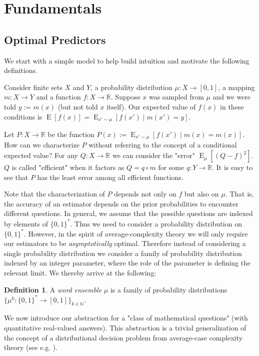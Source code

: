 \documentclass{article}
\theoremstyle{definition}
\newtheorem{definition}{Definition}[section]
\theoremstyle{plain}
\newcommand{\Words}{{\{ 0, 1 \}^*}}
\DeclareMathOperator{\E}{E}
\newcommand{\Nats}{\mathbb{N}}
\newcommand{\Reals}{\mathbb{R}}
\begin{document}
\section{Fundamentals}
%
\subsection{Optimal Predictors}

We start with a simple model to help build intuition and motivate the following definitions.

Consider finite sets $X$ and $Y$, a probability distribution $\mu: X \rightarrow [0,1]$, a mapping $m: X \rightarrow Y$ and a function $f: X \rightarrow \Reals$. Suppose $x$ was sampled from $\mu$ and we were told $y := m(x)$ (but not told $x$ itself). Our expected value of $f(x)$ in these conditions is $\E[f(x)] = \E_{x' \sim \mu}[f(x') \mid m(x') = y]$.

Let $P: X \rightarrow \Reals$ be the function $P(x) := \E_{x' \sim \mu}[f(x') \mid m(x) = m(x)]$. How can we characterize $P$ without referring to the concept of a conditional expected value? For any $Q: X \rightarrow \Reals$ we can consider the "error" $\E_\mu[(Q - f)^2]$. $Q$ is called "efficient" when it factors as $Q = q \circ m$ for some $q: Y \rightarrow \Reals$. It is easy to see that $P$ has the least error among all efficient functions.

Note that the characterization of $P$ depends not only on $f$ but also on $\mu$. That is, the accuracy of an estimator depends on the prior probabilities to encounter different questions. In general, we assume that the possible questions are indexed by elements of $\Words$. Thus we need to consider a probability distribution on $\Words$. However, in the spirit of average-complexity theory we will only require our estimators to be \emph{asymptotically} optimal. Therefore instead of considering a single probability distribution we consider a family of probability distribution indexed by an integer parameter, where the role of the parameter is defining the relevant limit. We thereby arrive at the following:

\begin{definition}

A \emph{word ensemble} $\mu$ is a family of probability distributions $\{\mu^k: \Words \rightarrow [0,1]\}_{k \in \Nats}$.

\end{definition}

We now introduce our abstraction for a "class of mathematical questions" (with quantitative real-valued answers). This abstraction is a trivial generalization of the concept of a distributional decision problem from average-case complexity theory (see e.g. \cite{Bogdanov_2006}).
\end{document}
